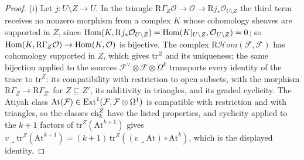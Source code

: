 \begin{proof}
(i) Let $j\colon U\setminus Z\to U$. In the triangle $\mathrm{R}\Gamma_{Z}\mathcal{O}\to\mathcal{O}\to\mathrm{R}j_{*}\mathcal{O}_{U\setminus Z}$ the third term receives no nonzero morphism from a complex $K$ whose cohomology sheaves are supported in $Z$, since $\mathrm{Hom}(K,\mathrm{R}j_{*}\mathcal{O}_{U\setminus Z})=\mathrm{Hom}(K|_{U\setminus Z},\mathcal{O}_{U\setminus Z})=0$; so $\mathrm{Hom}(K,\mathrm{R}\Gamma_{Z}\mathcal{O})\to\mathrm{Hom}(K,\mathcal{O})$ is bijective. The complex $\mathrm{R}\mathcal{H}om(\mathcal{F},\mathcal{F})$ has cohomology supported in $Z$, which gives $\mathrm{tr}^{Z}$ and its uniqueness; the same bijection applied to the sources $\mathcal{F}^{\vee}\otimes\mathcal{F}\otimes\Omega^{k}$ transports every identity of the trace to $\mathrm{tr}^{Z}$: its compatibility with restriction to open subsets, with the morphism $\mathrm{R}\Gamma_{Z}\to\mathrm{R}\Gamma_{Z'}$ for $Z\subseteq Z'$, its additivity in triangles, and its graded cyclicity. The Atiyah class $\mathrm{At}(\mathcal{F})\in\mathrm{Ext}^{1}(\mathcal{F},\mathcal{F}\otimes\Omega^{1})$ is compatible with restriction and with triangles, so the classes $\mathrm{ch}^{Z}_{k}$ have the listed properties, and cyclicity applied to the $k+1$ factors of $\mathrm{tr}^{Z}(\mathrm{At}^{k+1})$ gives $v\lrcorner\mathrm{tr}^{Z}(\mathrm{At}^{k+1})=(k+1)\,\mathrm{tr}^{Z}((v\lrcorner\mathrm{At})\circ\mathrm{At}^{k})$, which is the displayed identity.


\end{proof}
